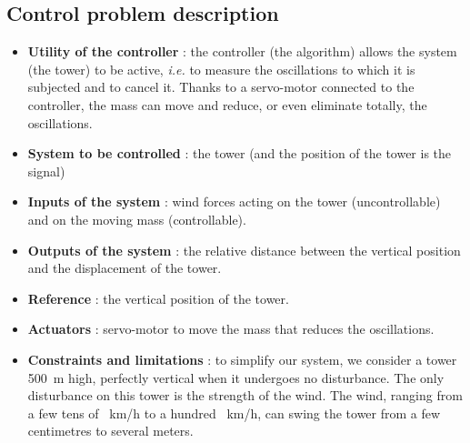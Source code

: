\subsection{Control problem description}
\begin{itemize}
    \item {\bf Utility of the controller} : the controller (the algorithm) allows the system (the tower) to be active, {\it i.e.} to measure the oscillations to which it is subjected and to cancel it. Thanks to a servo-motor connected to the controller, the mass can move and reduce, or even eliminate totally, the oscillations.
    \item {\bf System to be controlled} : the tower (and the position of the tower is the signal)
    \item {\bf Inputs of the system} : wind forces acting on the tower (uncontrollable) and on the moving mass (controllable).
    \item {\bf Outputs of the system} : the relative distance between the vertical position and the displacement of the tower.
    \item {\bf Reference} : the vertical position of the tower.
    \item {\bf Actuators} : servo-motor to move the mass that reduces the oscillations.
    \item {\bf Constraints and limitations} : to simplify our system, we consider a tower \SI{500}{\meter} high, perfectly vertical when it undergoes no disturbance. The only disturbance on this tower is the strength of the wind. The wind, ranging from a few tens of \SI{}{\kilo\meter/\hour} to a hundred \SI{}{\kilo\meter/\hour}, can swing the tower from a few centimetres to several meters.
\end{itemize}
